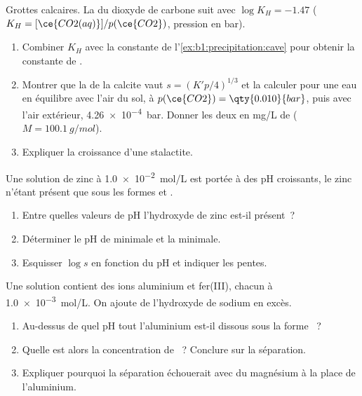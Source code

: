 \begin{exercise}[$\star\star\star$]\label{exo:b1:precipitation:10}
Grottes calcaires. La  du dioxyde de carbone suit
 avec $\log K_H = -1.47$ ($K_H =
[\ce{CO2(aq)}]/p(\ce{CO2})$, pression en bar).
\begin{enumerate}
  \item Combiner $K_H$ avec la constante de
        l'\cref{ex:b1:precipitation:cave} pour obtenir la constante de
        .
  \item Montrer que la  de la calcite vaut $s = (K'p/4)^{1/3}$
        et la calculer pour une eau en équilibre avec l'air du sol, à
        $p(\ce{CO2}) = \qty{0.010}{bar}$, puis avec l'air extérieur,
        \qty{4.26e-4}{bar}. Donner les deux en \unit{mg/L} de 
        ($M = \qty{100.1}{g/mol}$).
  \item Expliquer la croissance d'une stalactite.
\end{enumerate}
\end{exercise}

\begin{exercise}[$\star\star\star$]\label{exo:b1:precipitation:11}
Une solution de zinc à \qty{1.0e-2}{mol/L} est portée à des pH
croissants, le zinc n'étant présent que sous les formes  et
.
\begin{enumerate}
  \item Entre quelles valeurs de pH l'hydroxyde de zinc est-il présent~?
  \item Déterminer le pH de  minimale et la 
        minimale.
  \item Esquisser $\log s$ en fonction du pH et indiquer les pentes.
\end{enumerate}
\end{exercise}

\begin{exercise}[$\star\star\star$]\label{exo:b1:precipitation:12}
Une solution contient des ions aluminium et fer(III), chacun à
\qty{1.0e-3}{mol/L}. On ajoute de l'hydroxyde de sodium en excès.
\begin{enumerate}
  \item Au-dessus de quel pH tout l'aluminium est-il dissous sous la
        forme ~?
  \item Quelle est alors la concentration de ~? Conclure sur
        la séparation.
  \item Expliquer pourquoi la séparation échouerait avec du magnésium à
        la place de l'aluminium.
\end{enumerate}
\end{exercise}

